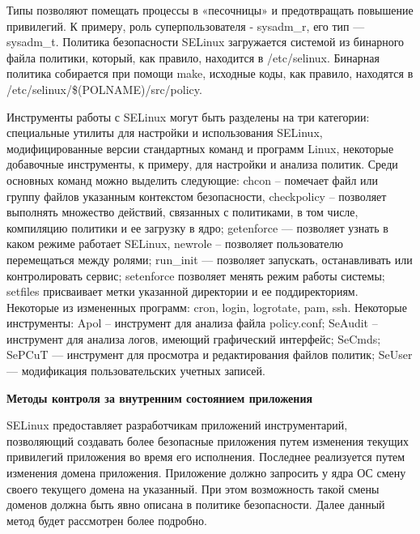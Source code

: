 Типы позволяют помещать 
процессы в «песочницы» и предотвращать повышение 
привилегий. К примеру, роль суперпользователя - 
sysadm\_r, его тип — sysadm\_t. Политика безопасности 
SELinux загружается системой из бинарного файла политики,
который, как правило, находится в /etc/selinux. 
Бинарная политика собирается при помощи make, исходные 
коды, как правило, находятся в /etc/selinux/\$(POLNAME)/src/policy.

Инструменты работы с SELinux могут быть разделены на 
три категории: специальные утилиты для настройки и 
использования SELinux, модифицированные версии стандартных 
команд и программ Linux, некоторые добавочные инструменты,
к примеру, для настройки и анализа политик. Среди основных 
команд можно выделить следующие: chcon – помечает файл или 
группу файлов указанным контекстом безопасности, checkpolicy
– позволяет выполнять множество действий, связанных с 
политиками, в том числе, компиляцию политики и ее загрузку 
в ядро; getenforce — позволяет узнать в каком режиме 
работает SELinux, newrole – позволяет пользователю 
перемещаться между ролями; run\_init — позволяет 
запускать, останавливать или контролировать сервис; 
setenforce позволяет менять режим работы системы; 
setfiles присваивает метки указанной директории и ее 
поддиректориям. Некоторые из измененных программ: cron, 
login, logrotate, pam, ssh. Некоторые инструменты: Apol 
– инструмент для анализа файла policy.conf; SeAudit – 
инструмент для анализа логов, имеющий графический интерфейс; 
SeCmds; SePCuT — инструмент для просмотра и редактирования 
файлов политик; SeUser — модификация пользовательских 
учетных записей. 

\bigskip
{\bfseries Методы контроля за внутренним 
состоянием приложения} 

SELinux предоставляет разработчикам приложений 
инструментарий, позволяющий создавать более 
безопасные приложения путем изменения текущих
привилегий приложения во время его исполнения. 
Последнее реализуется путем изменения домена приложения. 
Приложение должно запросить у ядра ОС смену своего 
текущего домена на указанный. При этом возможность
такой смены доменов должна быть явно описана в 
политике безопасности. Далее данный метод будет
рассмотрен более подробно.  
\bigskip

